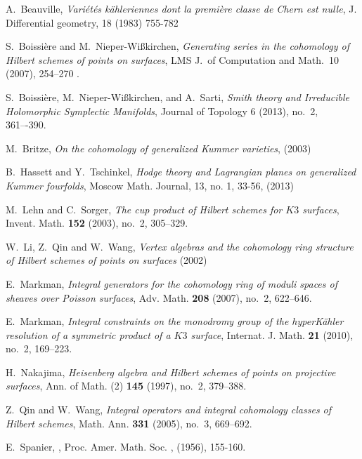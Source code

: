 \documentclass{amsart}
\theoremstyle{plain}
\theoremstyle{definition}
\theoremstyle{remark}
\begin{document}

\begin{thebibliography}{10}

A.~Beauville, \emph{Vari\'et\'es k\"ahleriennes dont la premi\`ere classe de Chern est nulle}, 
  J. Differential geometry, 18 (1983) 755-782

S.~Boissi\`ere and M.~Nieper-Wi{\ss}kirchen, \emph{Generating series in the cohomology 
  of Hilbert schemes of points on surfaces}, LMS J.~of Computation and Math.~10 (2007), 254--270 .

S.~Boissi\`ere, M.~Nieper-Wi{\ss}kirchen, and A.~Sarti, \emph{Smith theory and 
  Irreducible Holomorphic Symplectic Manifolds}, Journal of Topology 6 (2013), no.~2, 361–-390.

M.~Britze, \emph{On the cohomology of generalized Kummer varieties}, (2003) 

B.~Hassett and Y.~Tschinkel, \emph{ Hodge theory and Lagrangian planes on 
  generalized Kummer fourfolds}, Moscow Math. Journal, 13, no. 1, 33-56, (2013) 
  
M.~Lehn and C.~Sorger, \emph{The cup product of {H}ilbert schemes for {$K3$}
  surfaces}, Invent. Math. \textbf{152} (2003), no.~2, 305--329.

W.~Li, Z.~Qin and W.~Wang, \emph{Vertex algebras and the cohomology ring structure of 
  Hilbert schemes of points on surfaces} (2002)

E.~Markman, \emph{Integral generators for the cohomology ring of moduli spaces of
  sheaves over {P}oisson surfaces}, Adv. Math. \textbf{208} (2007), no.~2,
  622--646.

E.~Markman, \emph{Integral constraints on the monodromy group of the
  hyper{K}\"ahler resolution of a symmetric product of a {$K3$} surface},
  Internat. J. Math. \textbf{21} (2010), no.~2, 169--223.

H.~Nakajima, \emph{Heisenberg algebra and {H}ilbert schemes of points on
  projective surfaces}, Ann. of Math. (2) \textbf{145} (1997), no.~2, 379--388.

Z.~Qin and W.~Wang, \emph{Integral operators and integral cohomology classes of
  {H}ilbert schemes}, Math. Ann. \textbf{331} (2005), no.~3, 669--692.

E.~Spanier, 
,
\newblock Proc. Amer. Math. Soc.
, (1956), 155-160.

\end{thebibliography}
\end{document}
